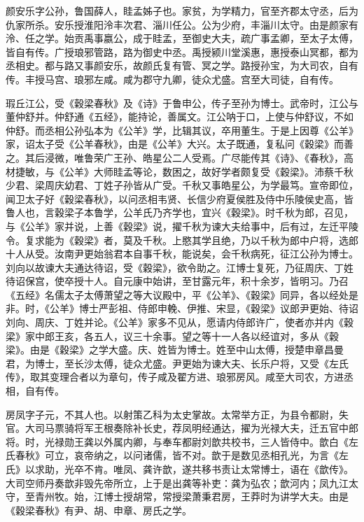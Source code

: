 \documentclass[]{article}
\begin{document}
颜安乐字公孙，鲁国薛人，眭孟姊子也。家贫，为学精力，官至齐郡太守丞，后为仇家所杀。安乐授淮阳泠丰次君、淄川任公。公为少府，丰淄川太守。由是颜家有泠、任之学。始贡禹事嬴公，成于眭孟，至御史大夫，疏广事孟卿，至太子太傅，皆自有传。广授琅邪管路，路为御史中丞。禹授颍川堂溪惠，惠授泰山冥都，都为丞相史。都与路又事颜安乐，故颜氏复有管、冥之学。路授孙宝，为大司农，自有传。丰授马宫、琅邪左咸。咸为郡守九卿，徒众尤盛。宫至大司徒，自有传。

瑕丘江公，受《穀梁春秋》及《诗》于鲁申公，传子至孙为博士。武帝时，江公与董仲舒并。仲舒通《五经》，能持论，善属文。江公呐于口，上使与仲舒议，不如仲舒。而丞相公孙弘本为《公羊》学，比辑其议，卒用董生。于是上因尊《公羊》家，诏太子受《公羊春秋》，由是《公羊》大兴。太子既通，复私问《穀梁》而善之。其后浸微，唯鲁荣广王孙、皓星公二人受焉。广尽能传其《诗》、《春秋》，高材捷敏，与《公羊》大师眭孟等论，数困之，故好学者颇复受《穀梁》。沛蔡千秋少君、梁周庆幼君、丁姓子孙皆从广受。千秋又事皓星公，为学最笃。宣帝即位，闻卫太子好《穀梁春秋》，以问丞相韦贤、长信少府夏侯胜及侍中乐陵侯史高，皆鲁人也，言穀梁子本鲁学，公羊氏乃齐学也，宜兴《穀梁》。时千秋为郎，召见，与《公羊》家并说，上善《穀梁》说，擢千秋为谏大夫给事中，后有过，左迁平陵令。复求能为《穀梁》者，莫及千秋。上愍其学且绝，乃以千秋为郎中户将，选郎十人从受。汝南尹更始翁君本自事千秋，能说矣，会千秋病死，征江公孙为博士。刘向以故谏大夫通达待诏，受《穀梁》，欲令助之。江博士复死，乃征周庆、丁姓待诏保宫，使卒授十人。自元康中始讲，至甘露元年，积十余岁，皆明习。乃召《五经》名儒太子太傅萧望之等大议殿中，平《公羊》、《穀梁》同异，各以经处是非。时，《公羊》博士严彭祖、侍郎申輓、伊推、宋显，《穀梁》议郎尹更始、待诏刘向、周庆、丁姓并论。《公羊》家多不见从，愿请内侍郎许广，使者亦并内《穀梁》家中郎王亥，各五人，议三十余事。望之等十一人各以经谊对，多从《穀梁》。由是《穀梁》之学大盛。庆、姓皆为博士。姓至中山太傅，授楚申章昌曼君，为博士，至长沙太傅，徒众尤盛。尹更始为谏大夫、长乐户将，又受《左氏传》，取其变理合者以为章句，传子咸及翟方进、琅邪房风。咸至大司农，方进丞相，自有传。

房凤字子元，不其人也。以射策乙科为太史掌故。太常举方正，为县令都尉，失官。大司马票骑将军王根奏除补长史，荐凤明经通达，擢为光禄大夫，迁五官中郎将。时，光禄勋王龚以外属内卿，与奉车都尉刘歆共校书，三人皆侍中。歆白《左氏春秋》可立，哀帝纳之，以问诸儒，皆不对。歆于是数见丞相孔光，为言《左氏》以求助，光卒不肯。唯凤、龚许歆，遂共移书责让太常博士，语在《歆传》。大司空师丹奏歆非毁先帝所立，上于是出龚等补吏：龚为弘农；歆河内；凤九江太守，至青州牧。始，江博士授胡常，常授梁萧秉君房，王莽时为讲学大夫。由是《穀梁春秋》有尹、胡、申章、房氏之学。
\end{document}
